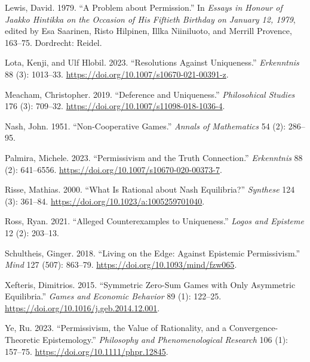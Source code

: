 \documentclass[
  11pt,
]{article}
\newlength{\cslhangindent}
\newlength{\cslentryspacingunit} %
\newenvironment{CSLReferences}[2] %
 {%
  \setlength{\parindent}{0pt}
  \ifodd #1
  \let\oldpar\par
  \def\par{\hangindent=\cslhangindent\oldpar}
  \fi
  \setlength{\parskip}{#2\cslentryspacingunit}
 }%
 {}
\begin{document}
\begin{CSLReferences}{1}{0}
\leavevmode{}%
Lewis, David. 1979. {``A Problem about Permission.''} In \emph{Essays in Honour of {J}aakko Hintikka on the Occasion of His Fiftieth Birthday on {J}anuary 12, 1979}, edited by Esa Saarinen, Risto Hilpinen, Illka Niiniluoto, and Merrill Provence, 163--75. Dordrecht: Reidel.

\leavevmode{}%
Lota, Kenji, and Ulf Hlobil. 2023. {``Resolutions Against Uniqueness.''} \emph{Erkenntnis} 88 (3): 1013--33. \url{https://doi.org/10.1007/s10670-021-00391-z}.

\leavevmode{}%
Meacham, Christopher. 2019. {``Deference and Uniqueness.''} \emph{Philosohical Studies} 176 (3): 709--32. \url{https://doi.org/10.1007/s11098-018-1036-4}.

\leavevmode{}%
Nash, John. 1951. {``Non-Cooperative Games.''} \emph{Annals of Mathematics} 54 (2): 286--95.

\leavevmode{}%
Palmira, Michele. 2023. {``Permissivism and the Truth Connection.''} \emph{Erkenntnis} 88 (2): 641--6556. \url{https://doi.org/10.1007/s10670-020-00373-7}.

\leavevmode{}%
Risse, Mathias. 2000. {``What Is Rational about Nash Equilibria?''} \emph{Synthese} 124 (3): 361--84. \url{https://doi.org/10.1023/a:1005259701040}.

\leavevmode{}%
Ross, Ryan. 2021. {``Alleged Counterexamples to Uniqueness.''} \emph{Logos and Episteme} 12 (2): 203--13.

\leavevmode{}%
Schultheis, Ginger. 2018. {``Living on the Edge: Against Epistemic Permissivism.''} \emph{Mind} 127 (507): 863--79. \url{https://doi.org/10.1093/mind/fzw065}.

\leavevmode{}%
Xefteris, Dimitrios. 2015. {``Symmetric Zero-Sum Games with Only Asymmetric Equilibria.''} \emph{Games and Economic Behavior} 89 (1): 122--25. \url{https://doi.org/10.1016/j.geb.2014.12.001}.

\leavevmode{}%
Ye, Ru. 2023. {``Permissivism, the Value of Rationality, and a Convergence-Theoretic Epistemology.''} \emph{Philosophy and Phenomenological Research} 106 (1): 157--75. \url{https://doi.org/10.1111/phpr.12845}.

\end{CSLReferences}
\end{document}
